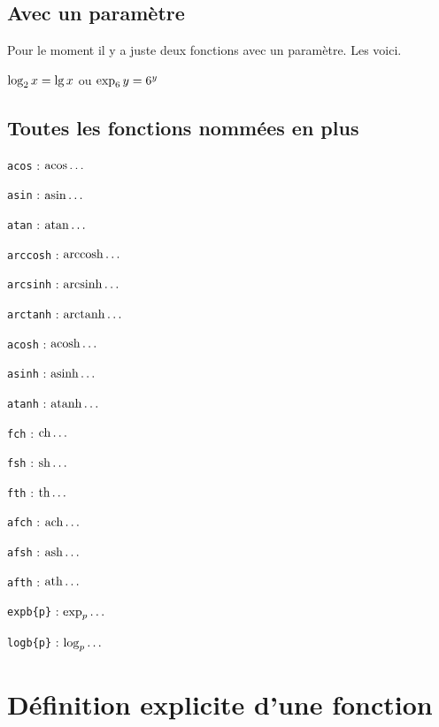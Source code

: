 \documentclass[12pt,a4paper]{book}
\theoremstyle{definition}
\begin{document}
{{\subsection{Avec un paramètre}

Pour le moment il y a juste deux fonctions avec un paramètre. Les voici.

\begin{latexex}
$\log_{2} x = \lg x$ ou
$\exp_{6} y = 6^y$
\end{latexex}




\subsection{Toutes les fonctions nommées en plus} \label{tnsana-all-named-functions}

\vspace{-1em}

\begin{multicols}{2}
    \verb+acos+ : $\operatorname{\operatorname{acos}}\dots$

    \verb+asin+ : $\operatorname{\operatorname{asin}}\dots$

    \verb+atan+ : $\operatorname{\operatorname{atan}}\dots$

    \verb+arccosh+ : $\operatorname{\operatorname{arccosh}}\dots$

    \verb+arcsinh+ : $\operatorname{\operatorname{arcsinh}}\dots$

    \verb+arctanh+ : $\operatorname{\operatorname{arctanh}}\dots$

    \verb+acosh+ : $\operatorname{\operatorname{acosh}}\dots$

    \verb+asinh+ : $\operatorname{\operatorname{asinh}}\dots$

    \verb+atanh+ : $\operatorname{\operatorname{atanh}}\dots$

    \verb+fch+ : $\operatorname{\operatorname{ch}}\dots$

    \verb+fsh+ : $\operatorname{\operatorname{sh}}\dots$

    \verb+fth+ : $\operatorname{\operatorname{th}}\dots$

    \verb+afch+ : $\operatorname{\operatorname{ach}}\dots$

    \verb+afsh+ : $\operatorname{\operatorname{ash}}\dots$

    \verb+afth+ : $\operatorname{\operatorname{ath}}\dots$

    \verb+expb{p}+ : $\exp_{p}\dots$

    \verb+logb{p}+ : $\log_{p}\dots$
\end{multicols}
\section{Définition explicite d'une fonction}

}}
\end{document}
